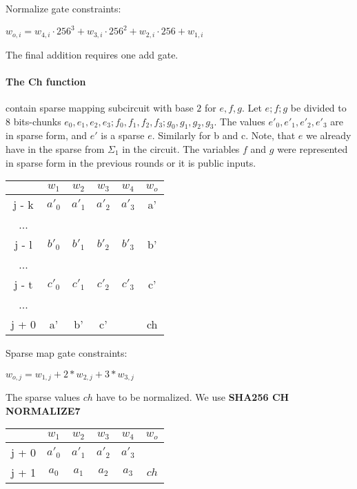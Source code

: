 Normalize gate constraints:
\begin{center}
$w_{o,i} = w_{4,i} \cdot 256^3 + w_{3,i} \cdot 256^2 + w_{2,i} \cdot 256 + w_{1,i}$ \\
\end{center}

The final addition requires one add gate.

\paragraph{The Ch function}
contain sparse mapping subcircuit with base $2$ for $e, f ,g$.
Let $e; f; g$ be divided to 8 bits-chunks $e_0, e_1, e_2, e_3; f_0, f_1, f_2, f_3; g_0, g_1, g_2, g_3$.
The values $e'_0, e'_1, e'_2, e'_3$ are in sparse form, and $e'$ is a sparse $e$.
Similarly for b and c. 
Note, that $e$ we already have in the sparse from $\Sigma_1$ in the circuit. 
The variables $f$ and $g$ were represented in sparse form in the previous rounds or it is public inputs.
\begin{center}
\begin{tabular}{ c|c|c|c|c|c } 
  & $w_1$ & $w_2$ & $w_3$ & $w_4$ & $w_o$\\ 
 \hline 
j - k & $a'_0$ & $a'_1$ & $a'_2$ & $a'_3$ & a' \\ 
... & & & & \\
j - l & $b'_0$ & $b'_1$ & $b'_2$ & $b'_3$ & b'\\ 
... & & & & \\
j - t & $c'_0$ & $c'_1$ & $c'_2$ & $c'_3$ & c' \\ 
... & & & & \\
j + 0 & a' & b' & c' & & ch\\
\end{tabular}
\end{center}
Sparse map gate constraints:
\begin{center}
$w_{o, j} = w_{1,j} + 2*w_{2, j} + 3*w_{3, j}$ \\
\end{center}

The sparse values $ch$ have to be normalized.
We use \textbf{SHA256 CH NORMALIZE7}
\begin{center}
\begin{tabular}{ c|c|c|c|c|c } 
  & $w_1$ & $w_2$ & $w_3$ & $w_4$ & $w_o$\\ 
 \hline
j + 0 & $a'_0$ & $a'_1$ & $a'_2$ & $a'_3$ &\\ 
j + 1 & $a_0$ & $ a_1$ & $a_2$ & $a_3$ &  $ch$ \\ 
\end{tabular}
\end{center}

